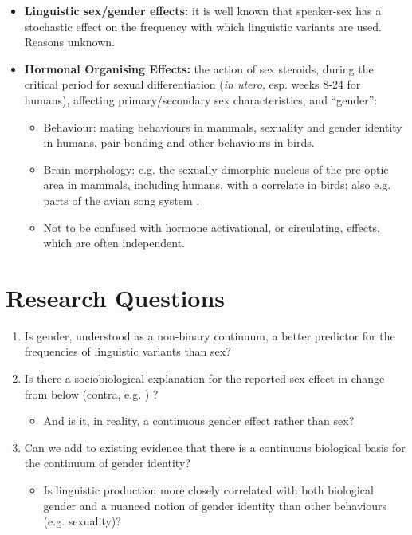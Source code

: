 \documentclass[a0,portrait]{a0poster}
\begin{document}
\begin{multicols}{2}
\begin{itemize}
		\item \textbf{Linguistic sex/gender effects:} it is well known that speaker-sex has a stochastic effect on the frequency with which linguistic variants are used. Reasons unknown.
		\item \textbf{Hormonal Organising Effects:} the action of sex steroids, during the critical period for sexual differentiation 
		(\textsl{in utero}, esp. weeks 8-24 for humans), affecting primary/secondary sex characteristics, and ``gender'':
			\begin{itemize}
				\item Behaviour: mating behaviours in mammals, sexuality and gender identity in humans, pair-bonding and other behaviours in birds.
				\item Brain morphology: e.g. the sexually-dimorphic nucleus of the pre-optic area in mammals, including humans, with a correlate in birds; also e.g. parts of the avian song system \citep[][]{balthazartetal2009}.
				\item Not to be confused with hormone activational, or circulating, effects, which are often independent.
			\end{itemize}
	\end{itemize}



\color{DarkSlateGray} %

\section*{Research Questions}


\begin{enumerate}
\item Is gender, understood as a non-binary continuum, a better predictor for the frequencies of linguistic variants than sex?
\item Is there a sociobiological explanation for the reported sex effect in change from below (contra, e.g. \citealt{labov2001, eckert2011}) ?
	\begin{itemize}
		\item And is it, in reality, a continuous gender effect rather than sex?
	\end{itemize}
\item Can we add to existing evidence that there is a continuous biological basis for the continuum of gender identity?
	\begin{itemize}
	\item Is linguistic production more closely correlated with both biological gender and a nuanced notion of gender identity than other behaviours (e.g. sexuality)?
	\end{itemize}



\end{enumerate}
\end{multicols}
\end{document}
